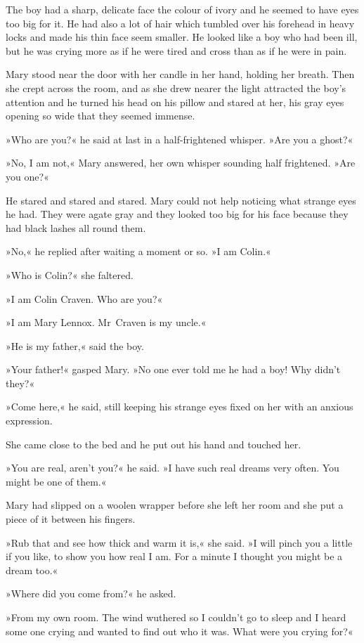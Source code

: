 The boy had a sharp, delicate face the colour of ivory and he seemed to have eyes too big for it. He had also a lot of hair which tumbled over his forehead in heavy locks and made his thin face seem smaller. He looked like a boy who had been ill, but he was crying more as if he were tired and cross than as if he were in pain.

Mary stood near the door with her candle in her hand, holding her breath. Then she crept across the room, and as she drew nearer the light attracted the boy's attention and he turned his head on his pillow and stared at her, his gray eyes opening so wide that they seemed immense.

»Who are you?« he said at last in a half-frightened whisper. »Are you a ghost?«

»No, I am not,« Mary answered, her own whisper sounding half frightened. »Are you one?«

He stared and stared and stared. Mary could not help noticing what strange eyes he had. They were agate gray and they looked too big for his face because they had black lashes all round them.

»No,« he replied after waiting a moment or so. »I am Colin.«

»Who is Colin?« she faltered.

»I am Colin Craven. Who are you?«

»I am Mary Lennox. Mr~Craven is my uncle.«

»He is my father,« said the boy.

»Your father!« gasped Mary. »No one ever told me he had a boy! Why didn't they?«

»Come here,« he said, still keeping his strange eyes fixed on her with an anxious expression.

She came close to the bed and he put out his hand and touched her.

»You are real, aren't you?« he said. »I have such real dreams very often. You might be one of them.«

Mary had slipped on a woolen wrapper before she left her room and she put a piece of it between his fingers.

»Rub that and see how thick and warm it is,« she said. »I will pinch you a little if you like, to show you how real I am. For a minute I thought you might be a dream too.«

»Where did you come from?« he asked.

»From my own room. The wind wuthered so I couldn't go to sleep and I heard some one crying and wanted to find out who it was. What were you crying for?«

